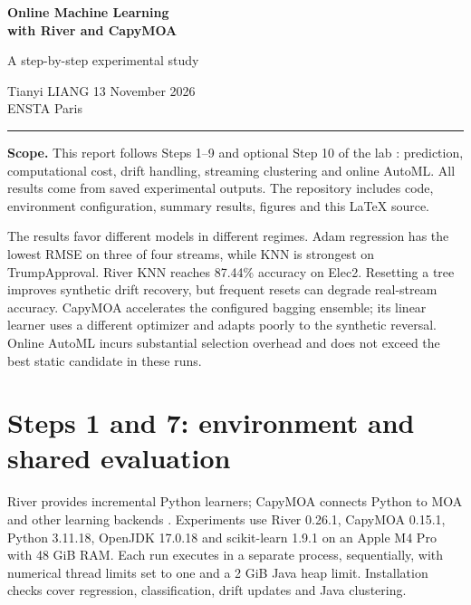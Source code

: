 \documentclass[10pt,a4paper]{article}
\begin{document}
\thispagestyle{empty}
{\LARGE\bfseries Online Machine Learning\\[3pt]with River and CapyMOA}\par
{\large A step-by-step experimental study}\par
Tianyi LIANG \hfill 13 November 2026\\
ENSTA Paris
\vspace{5pt}\hrule\vspace{5pt}
\textbf{Scope.} This report follows Steps 1--9 and optional Step 10 of the lab \cite{lab}: prediction, computational cost, drift handling, streaming clustering and online AutoML. All results come from saved experimental outputs. The repository includes code, environment configuration, summary results, figures and this \LaTeX{} source.\par
The results favor different models in different regimes. Adam regression has the lowest RMSE on three of four streams, while KNN is strongest on TrumpApproval. River KNN reaches 87.44\% accuracy on Elec2. Resetting a tree improves synthetic drift recovery, but frequent resets can degrade real-stream accuracy. CapyMOA accelerates the configured bagging ensemble; its linear learner uses a different optimizer and adapts poorly to the synthetic reversal. Online AutoML incurs substantial selection overhead and does not exceed the best static candidate in these runs.
\section{Steps 1 and 7: environment and shared evaluation}
River provides incremental Python learners; CapyMOA connects Python to MOA and other learning backends \cite{river,capymoa}. Experiments use River 0.26.1, CapyMOA 0.15.1, Python 3.11.18, OpenJDK 17.0.18 and scikit-learn 1.9.1 on an Apple M4 Pro with 48 GiB RAM. Each run executes in a separate process, sequentially, with numerical thread limits set to one and a 2 GiB Java heap limit. Installation checks cover regression, classification, drift updates and Java clustering.
\end{document}
